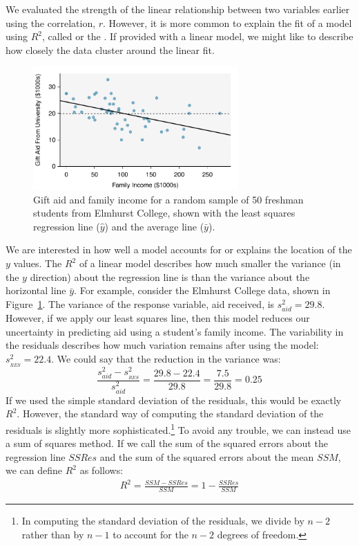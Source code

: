 
We evaluated the strength of the linear relationship between two variables earlier using the correlation, $r$. However, it is more common to explain the fit of a model using $R^2$, called  or the . If provided with a linear model, we might like to describe how closely the data cluster around the linear fit.


\begin{figure}[h]
\centering
\includegraphics[width=0.7\textwidth]{ch_regr_simple_linear/figures/elmhurstPlots/elmhurstScatterWAveLine}
\caption{Gift aid and family income for a random sample of 50 freshman students from Elmhurst College, shown with the least squares regression line ($\hat{y}$) and the average line ($\bar{y}$).}
\label{elmhurstScatterWLSROnly}
\end{figure}

We are interested in how well a model accounts for or explains the location of the $y$ values.
The $R^2$ of a linear model describes how much smaller the variance (in the $y$ direction) about the regression line is than the variance about the horizontal line $\bar{y}$.
For example, consider the Elmhurst College data, shown in Figure~\ref{elmhurstScatterWLSROnly}. The variance of the response variable, aid received, is $s_{aid}^2=29.8$. However, if we apply our least squares line, then this model reduces our uncertainty in predicting aid using a student's family income. The variability in the residuals describes how much variation remains after using the model: $s_{_{RES}}^2 = 22.4$.
We could say that the reduction in the variance was:
$$\frac{s_{aid}^2 - s_{_{RES}}^2}{s_{aid}^2}
	= \frac{29.8 - 22.4}{29.8} = \frac{7.5}{29.8}
	= 0.25$$
If we used the simple standard deviation of the
residuals, this would be exactly $R^2$.
However, the standard way of computing the standard deviation of the residuals is slightly more sophisticated.\footnote{In computing the standard deviation of the residuals, we divide by $n-2$ rather than by $n-1$ to account for the $n-2$ degrees of freedom.}
To avoid any trouble, we can instead use a sum of squares method.
If we call the sum of the squared errors about the regression line $SSRes$ and the sum of the squared errors about the mean $SSM$, we can define $R^2$ as follows:
\begin{align*}
R^2=\frac{SSM - SSRes}{SSM} = 1-\frac{SSRes}{SSM}
\end{align*}


